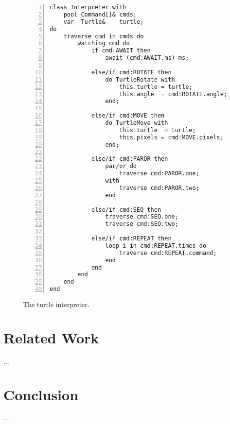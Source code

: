 \documentclass{acm_proc_article-sp}
\begin{document}
\begin{figure}%
\begin{lstlisting}[numbers=left,xleftmargin=3em]
class Interpreter with
    pool Command[]& cmds;
    var  Turtle&    turtle;
do
    traverse cmd in cmds do
        watching cmd do
            if cmd:AWAIT then
                await (cmd:AWAIT.ms) ms;

            else/if cmd:ROTATE then
                do TurtleRotate with
                    this.turtle = turtle;
                    this.angle  = cmd:ROTATE.angle;
                end;

            else/if cmd:MOVE then
                do TurtleMove with
                    this.turtle  = turtle;
                    this.pixels = cmd:MOVE.pixels;
                end;

            else/if cmd:PAROR then
                par/or do
                    traverse cmd:PAROR.one;
                with
                    traverse cmd:PAROR.two;
                end

            else/if cmd:SEQ then
                traverse cmd:SEQ.one;
                traverse cmd:SEQ.two;

            else/if cmd:REPEAT then
                loop i in cmd:REPEAT.times do
                    traverse cmd:REPEAT.command;
                end
            end
        end
    end
end
\end{lstlisting}
\caption{ The turtle interpreter.
\label{lst.turtle.interpreter}
}
\end{figure}

\section{Related Work}

...

\section{Conclusion}

...



\balancecolumns
\end{document}
